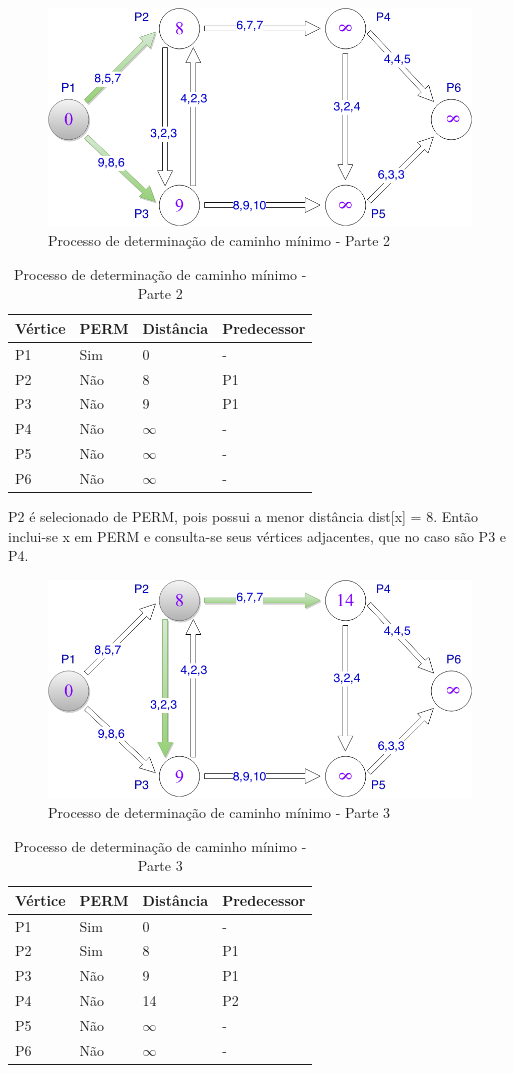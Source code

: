 \begin{figure}[htbp]
\centering
 \includegraphics[width=.50\textwidth]{chapters/fig/leo3.png}
\caption{Processo de determinação de caminho mínimo - Parte 2}
\label{fig:leo3}
\end{figure}

\begin{table}[htbp]
	\centering
	\begin{tabular}{l l l l}
	\toprule
	Vértice & PERM & Distância & Predecessor\\
	\midrule
	P1 & Sim & 0 & - \\
	P2 & Não & 8 & P1 \\
	P3 & Não & 9 & P1 \\
	P4 & Não & $\infty$ & - \\
	P5 & Não & $\infty$ & - \\
	P6 & Não & $\infty$ & - \\
	\bottomrule
	\end{tabular}
\caption{Processo de determinação de caminho mínimo - Parte 2}
 \label{tab:leotab2}
\end{table}
\FloatBarrier

P2 é selecionado de PERM, pois possui a menor distância dist[x] = 8. Então inclui-se x em PERM e consulta-se
seus vértices adjacentes, que no caso são P3 e P4.

\begin{figure}[htbp]
\centering
 \includegraphics[width=.50\textwidth]{chapters/fig/leo4.png}
\caption{Processo de determinação de caminho mínimo - Parte 3}
\label{fig:leo4}
\end{figure}
\FloatBarrier

\begin{table}[htbp]
	\centering
	\begin{tabular}{l l l l}
	\toprule
	Vértice & PERM & Distância & Predecessor\\
	\midrule
	P1 & Sim & 0 & - \\
	P2 & Sim & 8 & P1 \\
	P3 & Não & 9 & P1 \\
	P4 & Não & 14 & P2 \\
	P5 & Não & $\infty$ & - \\
	P6 & Não & $\infty$ & - \\
	\bottomrule
	\end{tabular}
\caption{Processo de determinação de caminho mínimo - Parte 3}
 \label{tab:leotab3}
\end{table}
\FloatBarrier

